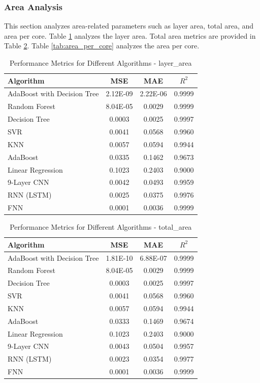 \documentclass[conference]{IEEEtran}
\begin{document}
	\subsubsection{Area Analysis}
	This section analyzes area-related parameters such as layer area, total area, and area per core. Table \ref{tab:layer_area} analyzes the layer area. Total area metrics are provided in Table \ref{tab:total_area}. Table \ref{tab:area_per_core} analyzes the area per core.

\begin{table}[htbp]
	\caption{Performance Metrics for Different Algorithms - layer\_area}
	\label{tab:layer_area}
	\begin{tabular}{lccc}
		\toprule
		\textbf{Algorithm} & \textbf{MSE} & \textbf{MAE} & \textbf{\(R^2\)} \\
		\midrule
		AdaBoost with Decision Tree & 2.12E-09 & 2.22E-06 & 0.9999 \\
		Random Forest & 8.04E-05 & 0.0029 & 0.9999 \\
		Decision Tree & 0.0003 & 0.0025 & 0.9997 \\
		SVR & 0.0041 & 0.0568 & 0.9960 \\
		KNN & 0.0057 & 0.0594 & 0.9944 \\
		AdaBoost & 0.0335 & 0.1462 & 0.9673 \\
		Linear Regression & 0.1023 & 0.2403 & 0.9000 \\
		9-Layer CNN                & 0.0042       & 0.0493       & 0.9959      \\ 
		RNN (LSTM)  & 0.0025       & 0.0375       & 0.9976      \\ 
		FNN                & 0.0001       & 0.0036       & 0.9999      \\ 
		\bottomrule
	\end{tabular}
\end{table}

\begin{table}[htbp]
	\caption{Performance Metrics for Different Algorithms - total\_area}
	\label{tab:total_area}
	\begin{tabular}{lccc}
		\toprule
		\textbf{Algorithm} & \textbf{MSE} & \textbf{MAE} & \textbf{\(R^2\)} \\
		\midrule
		AdaBoost with Decision Tree & 1.81E-10 & 6.88E-07 & 0.9999 \\
		Random Forest & 8.04E-05 & 0.0029 & 0.9999 \\
		Decision Tree & 0.0003 & 0.0025 & 0.9997 \\
		SVR & 0.0041 & 0.0568 & 0.9960 \\
		KNN & 0.0057 & 0.0594 & 0.9944 \\
		AdaBoost & 0.0333 & 0.1469 & 0.9674 \\
		Linear Regression & 0.1023 & 0.2403 & 0.9000 \\
		9-Layer CNN                & 0.0043       & 0.0504       & 0.9957      \\ 
		RNN (LSTM)  & 0.0023       & 0.0354       & 0.9977      \\ 
		FNN                & 0.0001       & 0.0036       & 0.9999      \\ 
		\bottomrule
	\end{tabular}
\end{table}
\end{document}
